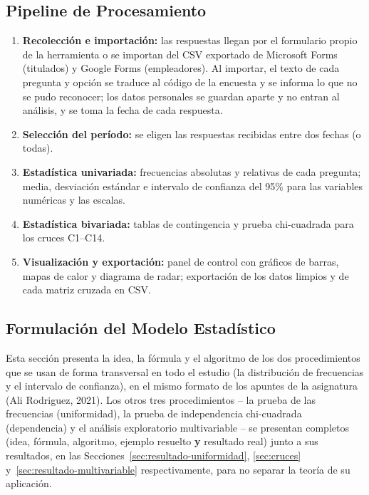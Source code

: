 \documentclass[12pt, a4paper]{article}
\begin{document}
\subsection{Pipeline de Procesamiento}

\begin{enumerate}
  \item \textbf{Recolección e importación:} las respuestas llegan por
  el formulario propio de la herramienta o se importan del CSV exportado
  de Microsoft Forms (titulados) y Google Forms (empleadores). Al
  importar, el texto de cada pregunta y opción se traduce al código de la
  encuesta y se informa lo que no se pudo reconocer; los datos
  personales se guardan aparte y no entran al análisis, y se toma la
  fecha de cada respuesta.
  \item \textbf{Selección del período:} se eligen las respuestas
  recibidas entre dos fechas (o todas).
  \item \textbf{Estadística univariada:} frecuencias absolutas y
  relativas de cada pregunta; media, desviación estándar e intervalo de
  confianza del 95\% para las variables numéricas y las escalas.
  \item \textbf{Estadística bivariada:} tablas de contingencia y prueba
  chi-cuadrada para los cruces C1--C14.
  \item \textbf{Visualización y exportación:} panel de control con
  gráficos de barras, mapas de calor y diagrama de radar; exportación de
  los datos limpios y de cada matriz cruzada en CSV.
\end{enumerate}

\subsection{Formulación del Modelo Estadístico}

Esta sección presenta la idea, la fórmula y el algoritmo de los dos
procedimientos que se usan de forma transversal en todo el estudio (la
distribución de frecuencias y el intervalo de confianza), en el mismo
formato de los apuntes de la asignatura (Ali Rodriguez, 2021). Los otros
tres procedimientos -- la prueba de las frecuencias (uniformidad), la
prueba de independencia chi-cuadrada (dependencia) y el análisis
exploratorio multivariable -- se presentan completos (idea, fórmula,
algoritmo, ejemplo resuelto \textbf{y} resultado real) junto a sus
resultados, en las Secciones~\ref{sec:resultado-uniformidad},
\ref{sec:cruces} y~\ref{sec:resultado-multivariable} respectivamente, para
no separar la teoría de su aplicación.
\end{document}
